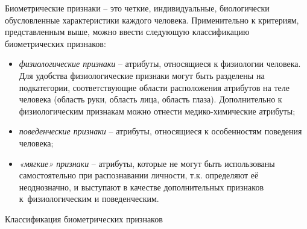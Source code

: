 \documentclass[12pt]{book}
\begin{document}
\large{Биометрические признаки -- это четкие, индивидуальные, биологически обусловленные характеристики каждого человека. Применительно к критериям, представленным выше, можно ввести следующую классификацию биометрических признаков:

\begin{itemize}[topsep=1pt] \itemsep0.1em
\item \textit{физиологические признаки} -- атрибуты, относящиеся к физиологии человека. Для удобства физиологические признаки могут быть разделены на подкатегории, соответствующие области расположения атрибутов на теле человека (область руки, область лица, область глаза). Дополнительно к физиологическим признакам можно отнести медико-химические атрибуты;
\item \textit{поведенческие признаки} -- атрибуты, относящиеся к особенностям поведения человека;
\item \textit{«мягкие» признаки} -- атрибуты, которые не могут быть использованы самостоятельно при распознавании личности, т.к. определяют её неоднозначно, и выступают в качестве дополнительных признаков к~физиологическим и поведенческим.
\end{itemize}

\begin{table}[h]
\centering
\caption{\label{tab:table_1_1}Классификация биометрических признаков}


\end{table}}
\end{document}
